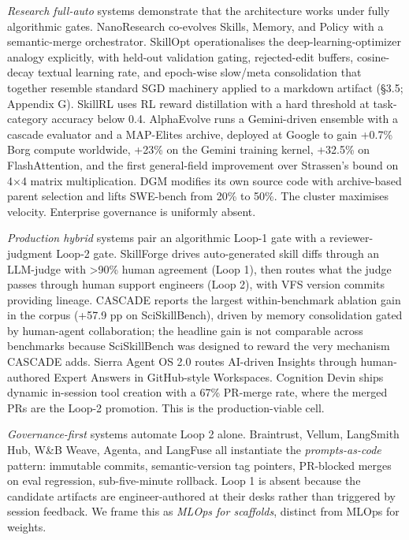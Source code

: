 \emph{Research full-auto} systems demonstrate that the architecture
works under fully algorithmic gates. NanoResearch co-evolves Skills,
Memory, and Policy with a semantic-merge orchestrator. SkillOpt
operationalises the deep-learning-optimizer analogy explicitly, with
held-out validation gating, rejected-edit buffers, cosine-decay textual
learning rate, and epoch-wise slow/meta consolidation that together
resemble standard SGD machinery applied to a markdown artifact (§3.5;
Appendix G). SkillRL uses RL reward distillation with a hard threshold
at task-category accuracy below 0.4. AlphaEvolve runs a Gemini-driven
ensemble with a cascade evaluator and a MAP-Elites archive, deployed at
Google to gain +0.7\% Borg compute worldwide, +23\% on the Gemini
training kernel, +32.5\% on FlashAttention, and the first general-field
improvement over Strassen's bound on 4×4 matrix multiplication. DGM
modifies its own source code with archive-based parent selection and
lifts SWE-bench from 20\% to 50\%. The cluster maximises velocity. Enterprise governance
is uniformly absent.

\emph{Production hybrid} systems pair an algorithmic Loop-1 gate with a
reviewer-judgment Loop-2 gate. SkillForge drives auto-generated skill
diffs through an LLM-judge with \textgreater90\% human agreement (Loop
1), then routes what the judge passes through human support engineers
(Loop 2), with VFS version commits providing lineage. CASCADE reports
the largest within-benchmark ablation gain in the corpus (+57.9 pp on
SciSkillBench), driven by memory consolidation gated by human-agent
collaboration; the headline gain is not comparable across benchmarks
because SciSkillBench was designed to reward the very mechanism CASCADE
adds. Sierra Agent OS 2.0 routes AI-driven Insights
through human-authored Expert Answers in GitHub-style Workspaces.
Cognition Devin ships dynamic in-session tool creation with a 67\%
PR-merge rate, where the merged PRs are the Loop-2 promotion. This is
the production-viable cell.

\emph{Governance-first} systems automate Loop 2 alone. Braintrust,
Vellum, LangSmith Hub, W\&B Weave, Agenta, and LangFuse all instantiate
the \emph{prompts-as-code} pattern: immutable commits, semantic-version
tag pointers, PR-blocked merges on eval regression, sub-five-minute
rollback. Loop 1 is absent because the candidate artifacts are
engineer-authored at their desks rather than triggered by session
feedback. We frame this as \emph{MLOps for scaffolds}, distinct from
MLOps for weights.

